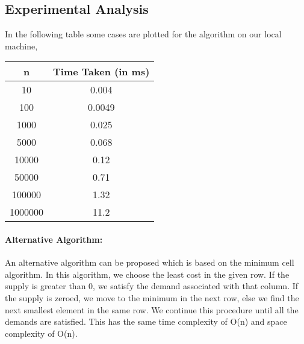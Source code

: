\documentclass[10pt]{article}
\begin{document}
\begin{multicols*}{2}
\section*{Experimental Analysis}
In the following table some cases are plotted for the algorithm on our local machine,
\begin{center}
 \begin{tabular}{||c | c||} 
 \hline
 n & Time Taken (in ms) \\ [0.5ex] 
 \hline\hline
 10 & 0.004 \\ 
 \hline
 100 & 0.0049 \\
 \hline
 1000 & 0.025 \\
 \hline
 5000 & 0.068 \\
 \hline
 10000 & 0.12 \\
 \hline
 50000 & 0.71 \\
 \hline
 100000 & 1.32 \\
 \hline
 1000000 & 11.2 \\ [1ex] 
 \hline
\end{tabular}
\end{center}


\paragraph{Alternative Algorithm:}

An alternative algorithm can be proposed which is based on the minimum cell algorithm. In this algorithm, we choose the least cost in the given row. If the supply is greater than 0, we satisfy the demand associated with that column. If the supply is zeroed, we move to the minimum in the next row, else we find the next smallest element in the same row. We continue this procedure until all the demands are satisfied. This has the same time complexity of O(n) and space complexity of O(n).


\end{multicols*}
\end{document}
